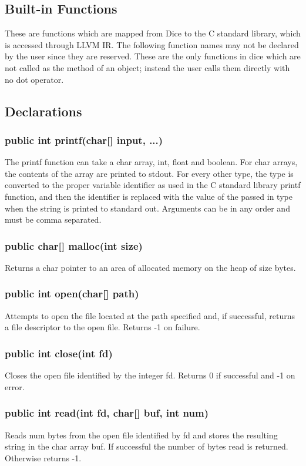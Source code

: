 \begin{homeworkProblem}
	\section{Built-in Functions}
    These are functions which are mapped from Dice to the C standard library, which is accessed through LLVM IR. The following function names may not be declared by the user since they are reserved. These are the only functions in dice which are not called as the method of an object; instead the user calls them directly with no dot operator.
	
	\subsection{Declarations}
    \subsubsection{public int printf(char[] input, ...)}
    The printf function can take a char array, int, float and boolean. For char arrays, the contents of the array are printed to stdout. For every other type, the type is converted to the proper variable identifier as used in the C standard library printf function, and then the identifier is replaced with the value of the passed in type when the string is printed to standard out. Arguments can be in any order and must be comma separated.
    \subsubsection{public char[] malloc(int size)}
    Returns a char pointer to an area of allocated memory on the heap of size bytes.
    \subsubsection{public int open(char[] path)}
    Attempts to open the file located at the path specified and, if successful, returns a file descriptor to the open file. Returns -1 on failure.
    \subsubsection{public int close(int fd)}
    Closes the open file identified by the integer fd. Returns 0 if successful and -1 on error.
    \subsubsection{public int read(int fd, char[] buf, int num)}
    Reads num bytes from the open file identified by fd and stores the resulting string in the char array buf. If successful the number of bytes read is returned. Otherwise returns -1.

\end{homeworkProblem}
